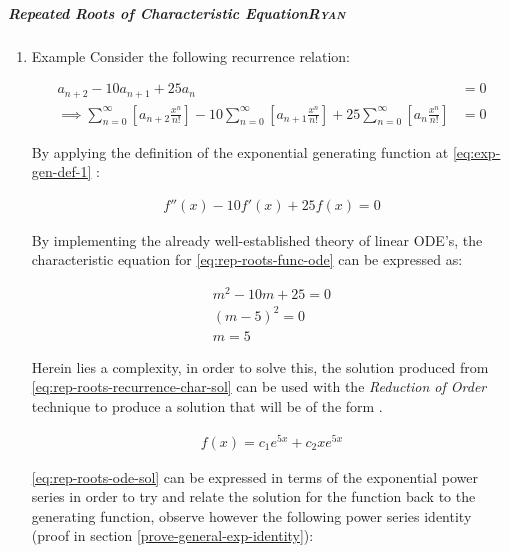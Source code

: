\documentclass[a4paper,11pt,twoside]{article}
\begin{document}
\subparagraph{Repeated Roots of Characteristic Equation\hfill{}\textsc{Ryan}}
\label{rep-roots-recurrence}
\begin{enumerate}
\item Example
\label{sec:orgf535fab}
Consider the following recurrence relation:

\begin{align}
    a_{n+2} -  10a_{n+ 1} +  25a_{n}&= 0 \label{eq:hom-repeated-roots-recurrence} \\
    \implies  \sum^{\infty}_{n= 0}   {\left[{ a_{n+2} \frac{x^n}{n!} }\right]} - 10 \sum^{\infty}_{n= 0}   {\left[{ a_{n+1} \frac{x^n}{n!}    }\right]} + 25 \sum^{\infty}_{n= 0 }   {\left[{  a_{n}\frac{x^n}{n!} }\right]}&= 0 \nonumber
\end{align}

By applying the definition of the exponential generating function at \eqref{eq:exp-gen-def-1} :

\begin{align}
    f''{\left({ x }\right)}- 10f'{\left({ x }\right)}+  25f{\left({ x }\right)}= 0 \label{eq:rep-roots-func-ode}
\end{align}

By implementing the already well-established theory of linear ODE's, the
characteristic equation for \eqref{eq:rep-roots-func-ode} can be expressed as:

\begin{align}
    m^2- 10m+  25 = 0 \nonumber \\
    {\left({ m- 5 }\right)}^2 = 0 \nonumber \\
    m= 5 \label{eq:rep-roots-recurrence-char-sol}
\end{align}

Herein lies a complexity, in order to solve this, the solution produced from \eqref{eq:rep-roots-recurrence-char-sol} can be used with the \emph{Reduction of Order} technique to produce a solution that will be of the form \cite[]{zillMatrixExponential2009}.

\begin{align}
    f{\left({ x }\right)}= c_1e^{5x} +  c_2 x e^{5x} \label{eq:rep-roots-ode-sol}
\end{align}

\eqref{eq:rep-roots-ode-sol} can be expressed in terms of the exponential power series in order to try and relate the solution for the function back to the generating function,
observe however the following power series identity (proof in section \ref{prove-general-exp-identity}):


\end{enumerate}
\end{document}
